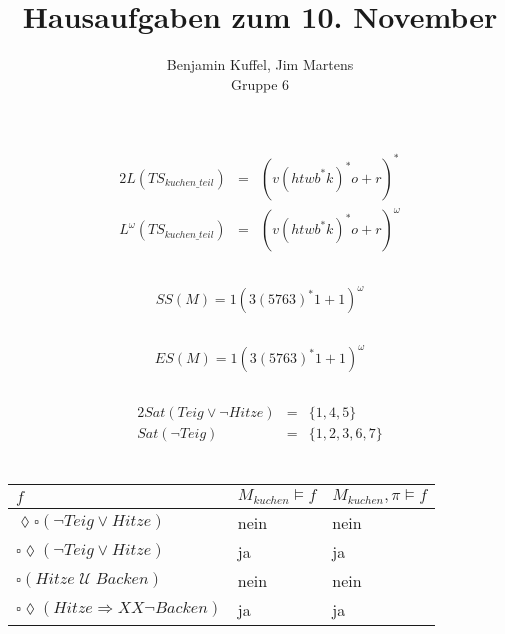 \documentclass[10pt,a4paper,oneside,ngerman,numbers=noenddot]{scrartcl}
\begin{document}
\author{Benjamin Kuffel, Jim Martens\\Gruppe 6}
\title{Hausaufgaben zum 10. November}
\maketitle

\setcounter{section}{2}
\section{} %
	\subsection{}
	\begin{alignat*}{2}
		L(TS_{kuchen\_teil}) &=& (v(htwb^{*}k)^{*}o + r)^{*} \\
		L^{\omega}(TS_{kuchen\_teil}) &=& (v(htwb^{*}k)^{*}o + r)^{\omega}
	\end{alignat*}
	\subsection{}
	\[
		SS(M) = 1(3(5763)^{*}1 + 1)^{\omega}
	\]
	\subsection{}
	\[
		ES(M) = 1(3(5763)^{*}1 + 1)^{\omega}
	\]
	\subsection{}
	\begin{alignat*}{2}
		Sat(Teig \vee \lnot Hitze) &=& \{1, 4, 5\} \\
		Sat(\lnot Teig) &=& \{1, 2, 3, 6, 7\}
	\end{alignat*}	
	
\section{} %
	\begin{tabular}{l|l|l}
		\(f\) & \(M_{kuchen} \models f \) & \(M_{kuchen}, \pi \models f\)\\
		\hline
		\(\lozenge \square(\lnot Teig \vee Hitze) \)& nein & nein \\
		\(\square	\lozenge(\lnot Teig \vee Hitze)\) & ja & ja \\
		\(\square	(Hitze \;\mathcal{U}\; Backen)\) & nein & nein \\
		\(\square	\lozenge (Hitze \Rightarrow XX\lnot Backen)\) & ja & ja
	\end{tabular}
\end{document}
